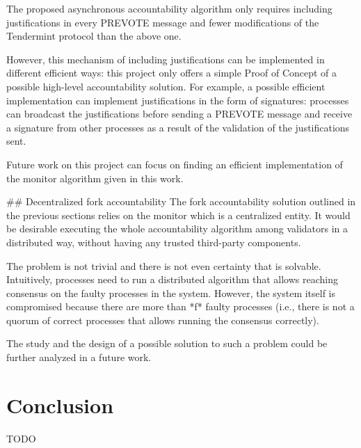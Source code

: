 \documentclass[a4paper,11pt,oneside]{report}
\begin{document}
\begin{markdown}
The proposed asynchronous accountability algorithm only requires including justifications in every PREVOTE message and fewer modifications of the Tendermint protocol than the above one.

However, this mechanism of including justifications can be implemented in different efficient ways: this project only offers a simple Proof of Concept of a possible high-level accountability solution.
For example, a possible efficient implementation can implement justifications in the form of signatures: processes can broadcast the justifications before sending a PREVOTE message and receive a signature from other processes as a result of the validation of the justifications sent.

Future work on this project can focus on finding an efficient implementation of the monitor algorithm given in this work.  


## Decentralized fork accountability
The fork accountability solution outlined in the previous sections relies on the monitor which is a centralized entity. It would be desirable executing the whole accountability algorithm among validators in a distributed way, without having any trusted third-party components.

The problem is not trivial and there is not even certainty that is solvable. 
Intuitively, processes need to run a distributed algorithm that allows reaching consensus on the faulty processes in the system.
However, the system itself is compromised because there are more than *f* faulty processes (i.e., there is not a quorum of correct processes that allows running the consensus correctly).

The study and the design of a possible solution to such a problem could be further analyzed in a future work.


\end{markdown}


\chapter{Conclusion}

TODO

\cleardoublepage
{}
{}
\printbibliography

%
%
\end{document}
